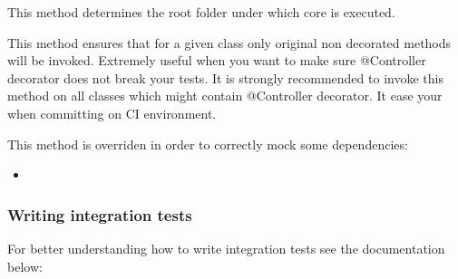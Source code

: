 \documentclass[letterpaper,10pt,english]{sphinxmanual}
\begin{document}
\begin{fulllineitems}
\begin{fulllineitems}
\label{get_started/contribute:fantastico.tests.base_case.FantasticoUnitTestsCase._get_root_folder}
This method determines the root folder under which core is executed.

\end{fulllineitems}


\begin{fulllineitems}
\label{get_started/contribute:fantastico.tests.base_case.FantasticoUnitTestsCase.check_original_methods}
This method ensures that for a given class only original non decorated methods will be invoked. Extremely useful
when you want to make sure @Controller decorator does not break your tests. It is strongly recommended to invoke
this method on all classes which might contain @Controller decorator. It ease your when committing on CI environment.

\end{fulllineitems}


\begin{fulllineitems}
\label{get_started/contribute:fantastico.tests.base_case.FantasticoUnitTestsCase.setup_once}
This method is overriden in order to correctly mock some dependencies:
\begin{itemize}
\item {} 
{\hyperref[features/mvc:fantastico.mvc.controller_decorators.Controller]{}}

\end{itemize}

\end{fulllineitems}


\end{fulllineitems}



\subsubsection{Writing integration tests}
\label{get_started/contribute:writing-integration-tests}
For better understanding how to write integration tests see the documentation below:
\end{document}
